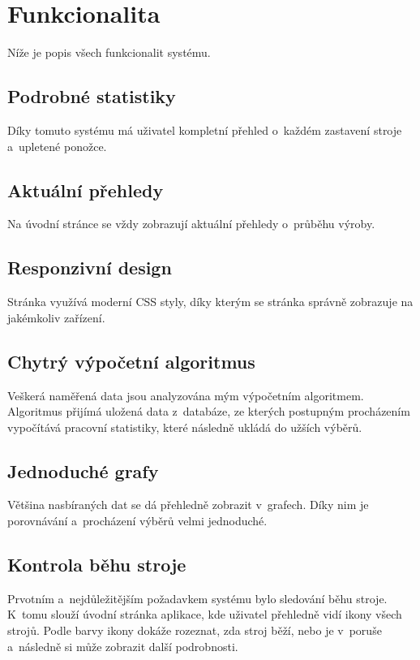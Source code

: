 \section{Funkcionalita}
Níže je popis všech funkcionalit systému.


\subsection{Podrobné statistiky}
Díky tomuto systému má uživatel kompletní přehled o~každém zastavení stroje a~upletené ponožce.


\subsection{Aktuální přehledy}
Na úvodní stránce se vždy zobrazují aktuální přehledy o~průběhu výroby.


\subsection{Responzivní design}
Stránka využívá moderní CSS styly, díky kterým se stránka správně zobrazuje na jakémkoliv zařízení. 


\subsection{Chytrý výpočetní algoritmus}
Veškerá naměřená data jsou analyzována mým výpočetním algoritmem.
Algoritmus přijímá uložená data z~databáze, ze kterých postupným procházením vypočítává pracovní statistiky, které následně ukládá do užších výběrů.


\subsection{Jednoduché grafy}
Většina nasbíraných dat se dá přehledně zobrazit v~grafech. 
Díky nim je porovnávání a~procházení výběrů velmi jednoduché. 


\subsection{Kontrola běhu stroje}
Prvotním a~nejdůležitějším požadavkem systému bylo sledování běhu stroje.
K~tomu slouží úvodní stránka aplikace, kde uživatel přehledně vidí ikony všech strojů.
Podle barvy ikony dokáže rozeznat, zda stroj běží, nebo je v~poruše a~následně si může zobrazit další podrobnosti. 

